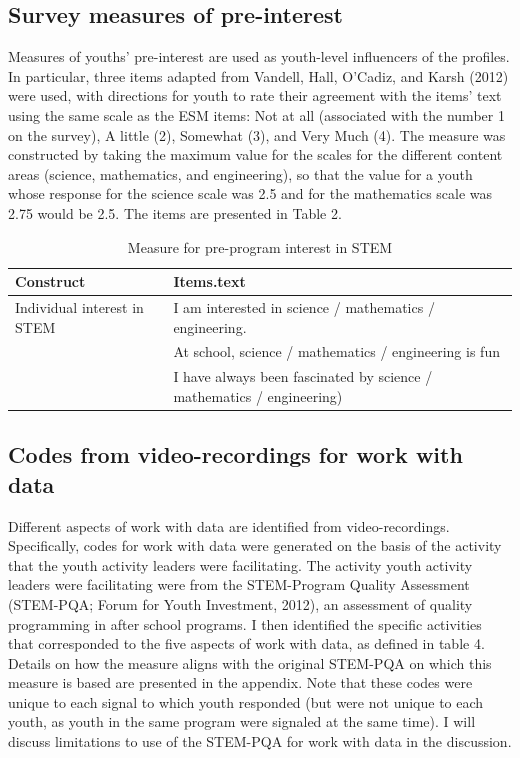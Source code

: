 \documentclass[]{msu-thesis}
\theoremstyle{definition}
\theoremstyle{definition}
\theoremstyle{definition}
\theoremstyle{remark}
\begin{document}
\subsection{Survey measures of
pre-interest}\label{survey-measures-of-pre-interest}

Measures of youths' pre-interest are used as youth-level influencers of
the profiles. In particular, three items adapted from Vandell, Hall,
O'Cadiz, and Karsh (2012) were used, with directions for youth to rate
their agreement with the items' text using the same scale as the ESM
items: Not at all (associated with the number 1 on the survey), A little
(2), Somewhat (3), and Very Much (4). The measure was constructed by
taking the maximum value for the scales for the different content areas
(science, mathematics, and engineering), so that the value for a youth
whose response for the science scale was 2.5 and for the mathematics
scale was 2.75 would be 2.5. The items are presented in Table 2.

\begin{table}

\caption{\label{tab:unnamed-chunk-5}Measure for pre-program interest in STEM}
\centering
\begin{tabular}[t]{ll}
\toprule
Construct & Items.text\\
\midrule
Individual interest in STEM & I am interested in science / mathematics / engineering.\\
 & At school, science / mathematics / engineering is fun\\
 & I have always been fascinated by science / mathematics / engineering)\\
\bottomrule
\end{tabular}
\end{table}

\subsection{Codes from video-recordings for work with
data}\label{codes-from-video-recordings-for-work-with-data}

Different aspects of work with data are identified from
video-recordings. Specifically, codes for work with data were generated
on the basis of the activity that the youth activity leaders were
facilitating. The activity youth activity leaders were facilitating were
from the STEM-Program Quality Assessment (STEM-PQA; Forum for Youth
Investment, 2012), an assessment of quality programming in after school
programs. I then identified the specific activities that corresponded to
the five aspects of work with data, as defined in table 4. Details on
how the measure aligns with the original STEM-PQA on which this measure
is based are presented in the appendix. Note that these codes were
unique to each signal to which youth responded (but were not unique to
each youth, as youth in the same program were signaled at the same
time). I will discuss limitations to use of the STEM-PQA for work with
data in the discussion.
\end{document}
